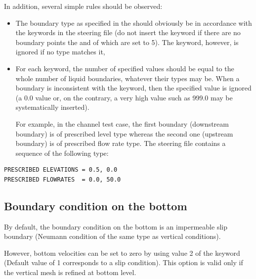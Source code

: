 In addition, several simple rules should be observed:
\begin{itemize}
\item The boundary type as specified in the 
should obviously be in accordance with the keywords in the steering file (do not
insert the keyword  if there are no boundary
points the  and  of which are set to
5). The keyword, however, is ignored if no type matches it,

\item For each keyword, the number of specified values should be equal to the whole
number of liquid boundaries, whatever their types may be. When a boundary is
inconsistent with the keyword, then the specified value is ignored (a 0.0 value
or, on the contrary, a very high value such as 999.0 may be systematically
inserted).

For example, in the channel test case, the first boundary (downstream boundary)
is of prescribed level type whereas the second one (upstream boundary) is of
prescribed flow rate type. The steering file contains a sequence of the
following type:
\end{itemize}
\begin{lstlisting}[language=TelemacCas]
PRESCRIBED ELEVATIONS = 0.5, 0.0
PRESCRIBED FLOWRATES  = 0.0, 50.0
\end{lstlisting}

\subsection{Boundary condition on the bottom}

By default, the boundary condition on the bottom is an impermeable slip
boundary (Neumann condition of the same type as vertical conditions).

However, bottom velocities can be set to zero by using value 2 of the keyword
 (Default value of 1 corresponds to a
slip condition). This option is valid only if the vertical mesh is refined at
bottom level.


